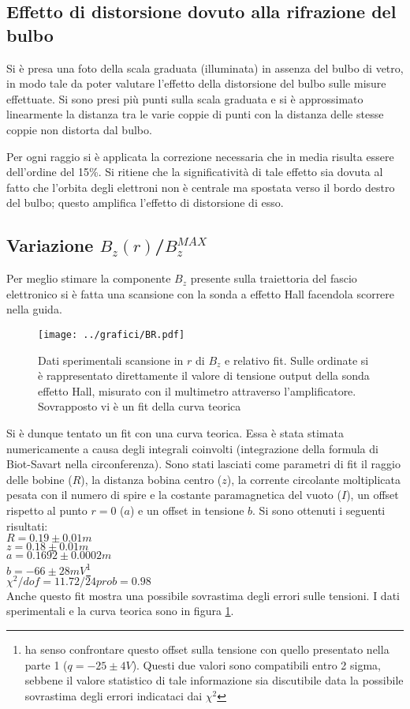 \documentclass[10pt,a4paper]{article}
\begin{document}
\subsection{Effetto di distorsione dovuto alla rifrazione del bulbo}
Si è presa una foto della scala graduata (illuminata) in assenza del bulbo di vetro, in modo tale da poter valutare l'effetto della distorsione del bulbo sulle misure effettuate. Si sono presi più punti sulla scala graduata e si è approssimato linearmente la distanza tra le varie coppie di punti con la distanza delle stesse coppie non distorta dal bulbo.

Per ogni raggio si è applicata la correzione necessaria che in media risulta essere dell'ordine del 15\%. Si ritiene che la significatività di tale effetto sia dovuta al fatto che l'orbita degli elettroni non è centrale ma spostata verso il bordo destro del bulbo; questo amplifica l'effetto di distorsione di esso.

\subsection{Variazione $B_z(r)$/$B_z^{MAX}$}

Per meglio stimare la componente $B_z$ presente sulla traiettoria del fascio elettronico si è fatta una scansione con la sonda a effetto Hall facendola scorrere nella guida. 

\begin{figure}[h!]
	\centering
	\texttt{[image: ../grafici/BR.pdf]}
	\caption{Dati sperimentali scansione in $r$ di $B_z$ e relativo fit. Sulle ordinate si è rappresentato direttamente il valore di tensione output della sonda effetto Hall, misurato con il multimetro attraverso l'amplificatore. Sovrapposto vi è un fit della curva teorica}
	\label{BR}
\end{figure}

Si è dunque tentato un fit con una curva teorica. Essa è stata stimata numericamente a causa degli integrali coinvolti (integrazione della formula di Biot-Savart nella circonferenza). Sono stati lasciati come parametri di fit il raggio delle bobine ($R$), la distanza bobina centro ($z$), la corrente circolante moltiplicata pesata con il numero di spire e la costante paramagnetica del vuoto ($I$), un offset rispetto al punto $r=0$ ($a$) e un offset in tensione $b$. Si sono ottenuti i seguenti risultati:\\
$R=0.19\pm 0.01 m$\\
$z=0.18\pm0.01 m$ \\
$a=0.1692 \pm 0.0002 m$\\ 
$b=-66 \pm 28 mV$\footnote{ha senso confrontare questo offset sulla tensione con quello presentato nella parte 1 ($q=-25\pm 4 V$). Questi due valori sono compatibili entro 2 sigma, sebbene il valore statistico di tale informazione sia discutibile data la possibile sovrastima degli errori indicataci dai $\chi^2$}\\
$\chi^2/dof=11.72 / 24 prob= 0.98$\\

Anche questo fit mostra una possibile sovrastima degli errori sulle tensioni. I dati sperimentali e la curva teorica sono in figura \ref{BR}.
\
\end{document}
